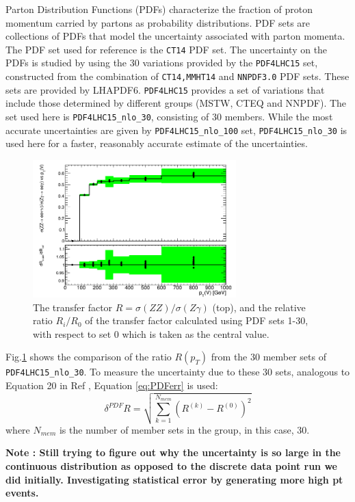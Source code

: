 \documentclass[11pt,a4paper,openright,twoside]{report}
\begin{document}
Parton Distribution Functions (PDFs) characterize the fraction of proton momentum carried by partons as probability distributions. PDF sets are collections of PDFs that model the uncertainty associated with parton momenta. The PDF set used for reference is the \texttt{CT14}\cite{CT14} PDF set. The uncertainty on the PDFs is studied by using the 30 variations provided by the \texttt{PDF4LHC15} set\cite{PDF4}, constructed from the combination of \texttt{CT14,MMHT14}\cite{MMHT14} and \texttt{NNPDF3.0}\cite{NNPDF3} PDF sets. These sets are provided by LHAPDF6\cite{LHAPDF}. \texttt{PDF4LHC15} provides a set of variations that include those determined by different groups (MSTW, CTEQ and NNPDF). The set used here is \texttt{PDF4LHC15\_nlo\_30}, consisting of 30 members. While the most accurate uncertainties are given by \texttt{PDF4LHC15\_nlo\_100} set, \texttt{PDF4LHC15\_nlo\_30} is used here for a faster, reasonably accurate estimate of the uncertainties.
\begin{figure}[H]
\centering
	\includegraphics[width = 0.7\textwidth]{R_pdf.png}
	\caption{The transfer factor $R = \sigma(ZZ)/\sigma(Z\gamma)$ (top), and the relative ratio $R_i/R_0$ of the transfer factor  calculated using PDF sets 1-30, with respect to set 0 which is taken as the central value. }
	\label{fig:PDF30var}
\end{figure}
\noindent Fig.\ref{fig:PDF30var} shows the comparison of the ratio $R(p_T)$ from the 30 member sets of \texttt{PDF4LHC15\_nlo\_30}. To measure the uncertainty due to these 30 sets, analogous to Equation 20 in Ref \cite{PDF4}, Equation \ref{eq:PDFerr} is used:
\begin{equation}\label{eq:PDFerr}
	\delta^{PDF}R = \sqrt{\sum^{N_{mem}}_{k=1} (R^{(k)} - R^{(0)})^2}
\end{equation}
where $N_{mem}$ is the number of member sets in the group, in this case, 30.

\textbf{Note : Still trying to figure out why the uncertainty is so large in the continuous distribution as opposed to the discrete data point run we did initially. Investigating statistical error by generating more high pt events.}
\end{document}
